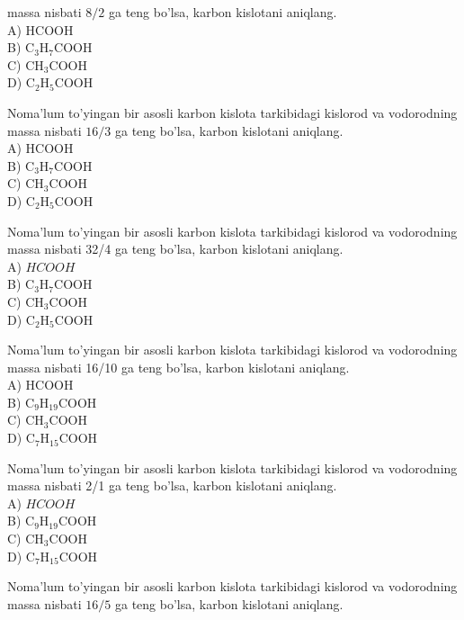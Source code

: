 massa nisbati $8 / 2$ ga teng bo'lsa, karbon kislotani aniqlang.\\
A) HCOOH\\
B) $\mathrm{C}_{3} \mathrm{H}_{7} \mathrm{COOH}$\\
C) $\mathrm{CH}_{3} \mathrm{COOH}$\\
D) $\mathrm{C}_{2} \mathrm{H}_{5} \mathrm{COOH}$
  \item Noma'lum to'yingan bir asosli karbon kislota tarkibidagi kislorod va vodorodning massa nisbati $16 / 3$ ga teng bo'lsa, karbon kislotani aniqlang.\\
A) HCOOH\\
B) $\mathrm{C}_{3} \mathrm{H}_{7} \mathrm{COOH}$\\
C) $\mathrm{CH}_{3} \mathrm{COOH}$\\
D) $\mathrm{C}_{2} \mathrm{H}_{5} \mathrm{COOH}$
  \item Noma'lum to'yingan bir asosli karbon kislota tarkibidagi kislorod va vodorodning massa nisbati 32/4 ga teng bo'lsa, karbon kislotani aniqlang.\\
A) $HCOOH$\\
B) $\mathrm{C}_{3} \mathrm{H}_{7} \mathrm{COOH}$\\
C) $\mathrm{CH}_{3} \mathrm{COOH}$\\
D) $\mathrm{C}_{2} \mathrm{H}_{5} \mathrm{COOH}$
  \item Noma'lum to'yingan bir asosli karbon kislota tarkibidagi kislorod va vodorodning massa nisbati 16/10 ga teng bo'lsa, karbon kislotani aniqlang.\\
A) HCOOH\\
B) $\mathrm{C}_{9} \mathrm{H}_{19} \mathrm{COOH}$\\
C) $\mathrm{CH}_{3} \mathrm{COOH}$\\
D) $\mathrm{C}_{7} \mathrm{H}_{15} \mathrm{COOH}$
  \item Noma'lum to'yingan bir asosli karbon kislota tarkibidagi kislorod va vodorodning massa nisbati 2/1 ga teng bo'lsa, karbon kislotani aniqlang.\\
A) $HCOOH$\\
B) $\mathrm{C}_{9} \mathrm{H}_{19} \mathrm{COOH}$\\
C) $\mathrm{CH}_{3} \mathrm{COOH}$\\
D) $\mathrm{C}_{7} \mathrm{H}_{15} \mathrm{COOH}$
  \item Noma'lum to'yingan bir asosli karbon kislota tarkibidagi kislorod va vodorodning massa nisbati $16 / 5$ ga teng bo'lsa, karbon kislotani aniqlang.\\
